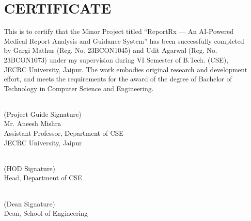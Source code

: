 \setcounter{page}{2}
\thispagestyle{plain}

\chapter*{CERTIFICATE}

\noindent This is to certify that the Minor Project titled ``ReportRx --- An AI-Powered Medical Report Analysis and Guidance System'' has been successfully completed by Gargi Mathur (Reg. No. 23BCON1045) and Udit Agarwal (Reg. No. 23BCON1073) under my supervision during VI Semester of B.Tech. (CSE), JECRC University, Jaipur. The work embodies original research and development effort, and meets the requirements for the award of the degree of Bachelor of Technology in Computer Science and Engineering.

\vspace{2cm}
\noindent\begin{minipage}{0.4\textwidth}
    \hrulefill \\
    (Project Guide Signature) \\[0.2cm]
    Mr. Aneesh Mishra \\[0.2cm]
    Assistant Professor, Department of CSE \\[0.2cm]
    JECRC University, Jaipur
\end{minipage}

\vspace{2cm}
\noindent\begin{minipage}{0.3\textwidth}
    \hrulefill \\
    (HOD Signature) \\[0.2cm]
    Head, Department of CSE
\end{minipage}

\vspace{2cm}
\noindent\begin{minipage}{0.3\textwidth}
    \hrulefill \\
    (Dean Signature) \\[0.2cm]
    Dean, School of Engineering
\end{minipage}
